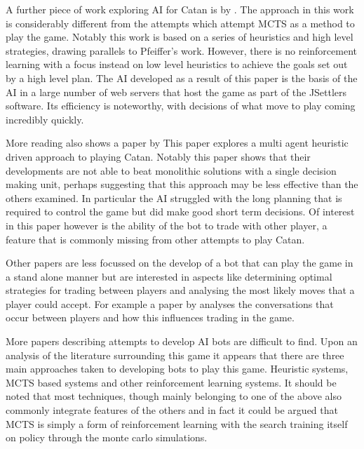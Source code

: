 \documentclass[]{article}
\begin{document}
\par A further piece of work exploring AI for Catan is by \textcite{thomas2003real}. The approach in this work is considerably different from the attempts which attempt MCTS as a method to play the game. Notably this work is based on a series of heuristics and high level strategies, drawing parallels to Pfeiffer's work. However, there is no reinforcement learning with a focus instead on low level heuristics to achieve the goals set out by a high level plan. The AI developed as a result of this paper is the basis of the AI in a large number of web servers that host the game as part of the JSettlers software. Its efficiency is noteworthy, with decisions of what move to play coming incredibly quickly.

\par More reading also shows a paper by \textcite{branca2007using} This paper explores a multi agent heuristic driven approach to playing Catan. Notably this paper shows that their developments are not able to beat monolithic solutions with a single decision making unit, perhaps suggesting that this approach may be less effective than the others examined. In particular the AI struggled with the long planning that is required to control the game but did make good short term decisions. Of interest in this paper however is the ability of the bot to trade with other player, a feature that is commonly missing from other attempts to play Catan.

\par Other papers are less focussed on the develop of a bot that can play the game in a stand alone manner but are interested in aspects like determining optimal strategies for trading between players and analysing the most likely moves that a player could accept. For example a paper by \textcite{afantenos2012developing} analyses the conversations that occur between players and how this influences trading in the game.

\par More papers describing attempts to develop AI bots are difficult to find. Upon an analysis of the literature surrounding this game it appears that there are three main approaches taken to developing bots to play this game. Heuristic systems, MCTS based systems and other reinforcement learning systems. It should be noted that most techniques, though mainly belonging to one of the above also commonly integrate features of the others and in fact it could be argued that MCTS is simply a form of reinforcement learning with the search training itself on policy through the monte carlo simulations.
\end{document}
